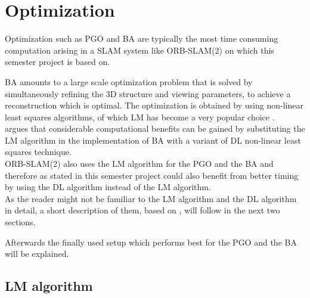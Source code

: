 \chapter{Optimization}
\label{sec:optimization}

Optimization such as \acf{PGO} and \acf{BA} are typically the most time consuming computation arising in a \acf{SLAM} system like ORB-SLAM(2) \cite{Mur-Artal2015,Mur-Artal2016} on which this semester project is based on.

\ac{BA} amounts to a large scale optimization problem that is solved by simultaneously refining the 3D structure and viewing parameters, to achieve a reconstruction which is optimal. The optimization is obtained by using non-linear least squares algorithms, of which \acf{LM} has become a very popular choice \cite{Lourakis2005}.\\

\cite{Lourakis2005} argues that considerable computational benefits can be gained by substituting the \ac{LM} algorithm in the implementation of \ac{BA} with a variant of \ac{DL} non-linear least squares technique.\\

ORB-SLAM(2) also uses the \ac{LM} algorithm for the \ac{PGO} and the \ac{BA} and therefore as stated in \cite{Lourakis2005} this semester project could also benefit from better timing by using the \ac{DL} algorithm instead of the \ac{LM} algorithm.\\

As the reader might not be familiar to the \ac{LM} algorithm and the \ac{DL} algorithm in detail, a short description of them, based on \cite{Lourakis2005}, will follow in the next two sections.

Afterwards the finally used setup which performs best for the \ac{PGO} and the \ac{BA} will be explained.

\section{\acf{LM} algorithm}

